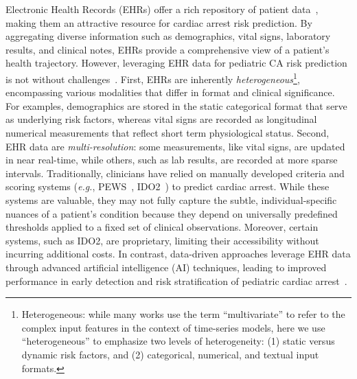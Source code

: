 Electronic Health Records (EHRs) offer a rich repository of patient data~\cite{zeng2020pic}, making them an attractive resource for cardiac arrest risk prediction. By aggregating diverse information such as demographics, vital signs, laboratory results, and clinical notes, EHRs provide a comprehensive view of a patient’s health trajectory. However, leveraging EHR data for pediatric CA risk prediction is not without challenges~\cite{wornow2023ehrshot}. 
First, EHRs are inherently \textit{heterogeneous}\footnote[2]{Heterogeneous: while many works use the term “multivariate” to refer to the complex input features in the context of time-series models, here we use “heterogeneous” to emphasize two levels of heterogeneity: (1) static versus dynamic risk factors, and (2) categorical, numerical, and textual input formats.}, encompassing various modalities that differ in format and clinical significance. For examples, demographics are stored in the static categorical format that serve as underlying risk factors, whereas vital signs are recorded as longitudinal numerical measurements that reflect short term physiological status.
Second, EHR data are \textit{multi-resolution}: some measurements, like vital signs, are updated in near real-time, while others, such as lab results, are recorded at more sparse intervals. 
Traditionally, clinicians have relied on manually developed criteria and scoring systems (\textit{e.g.}, PEWS~\cite{monaghan2005pews}, IDO2~\cite{loomba2023inadequate}) to predict cardiac arrest. While these systems are valuable, they may not fully capture the subtle, individual-specific nuances of a patient’s condition because they depend on universally predefined thresholds applied to a fixed set of clinical observations. Moreover, certain systems, such as IDO2, are proprietary, limiting their accessibility without incurring additional costs.
In contrast, data-driven approaches leverage EHR data through advanced artificial intelligence (AI) techniques, leading to improved performance in early detection and risk stratification of pediatric cardiac arrest~\cite{brown2025MLCA}.


